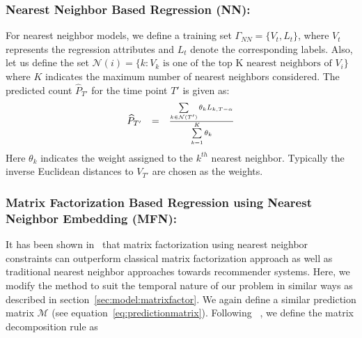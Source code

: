 \subsubsection{\label{sec:model:nearestneighbor} Nearest Neighbor Based Regression (NN):}
For nearest neighbor models, we define a training set $\Gamma_{NN}
= \lbrace V_t, L_t \rbrace$, where $V_t$ represents the regression attributes
and $L_t$ denote the corresponding labels.
Also, let us define the set 
$\mathcal{N}(i) = \lbrace k : \mbox{$V_k$ is one of the top  K nearest neighbors of $V_{i}$} \rbrace$ 
where $K$ indicates the maximum number of nearest neighbors considered.
The predicted count $\widehat{P}_{T'}$ for the time point $T'$ is given as:
\vspace{-1em}
\begin{equation} \label{eq:nearestneighbor:pred}
  \begin{array}{lcl}
    \widehat{P}_{T'} & = & \frac{\sum\limits_{k \in \mathcal{N}(T')} \theta_{k}L_{k,T - \alpha}}
    {\sum\limits_{k=1}^{K} \theta_{k}}\\
  \end{array}
    \vspace{-1em}
\end{equation}
\noindent
Here $\theta_k$ indicates the weight assigned to the $k^{th}$ nearest neighbor.
Typically the inverse Euclidean distances to $V_{T'}$ are chosen as the weights.

\subsubsection{\label{sec:model:nearestmatrix} Matrix Factorization Based
Regression using Nearest Neighbor Embedding (MFN):}
It has been shown in~\cite{koren2008factor} that matrix factorization using nearest neighbor constraints can
outperform classical matrix factorization approach as well as traditional nearest neighbor approaches towards
recommender systems. Here, we modify the method to suit the temporal nature of our problem in similar ways 
as described in section~\ref{sec:model:matrixfactor}. We again define a similar prediction matrix $\mathcal{M}$ 
(see equation~\ref{eq:predictionmatrix}). Following ~\cite{koren2008factor}, we define the 
matrix decomposition rule as 

